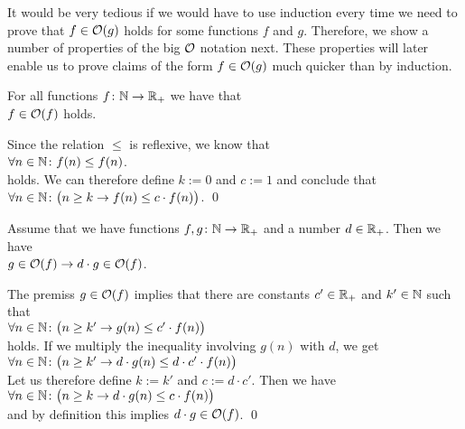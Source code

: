 It would be very tedious if we would have to use induction every time we need to prove that 
$f \in \mathcal{O}(g)$ holds for some functions $f$ and $g$.   Therefore, we show a number of properties of the
big $\mathcal{O}$ notation next.  These properties will later enable us to prove claims of the form 
$f \in \mathcal{O}(g)$ much quicker than by induction.

\begin{Proposition} 
  For all functions $f\colon {\mathbb N} \rightarrow {{\mathbb R}_+}$ we have that
  \\[0.2cm]
  \hspace*{1.3cm} $f \in \mathcal{O}(f)$ \quad holds. 
\end{Proposition}

\proof
Since the relation $\leq$ is reflexive, we know that 
\\[0.2cm]
\hspace*{1.3cm}
$\forall n \in {\mathbb N}\colon f(n) \leq f(n)$.
\\[0.2cm]
holds.  We can therefore define $k:=0$ and $c:=1$ and conclude that
\\[0.2cm]
\hspace*{1.3cm}
$\forall n \in {\mathbb N}\colon\bigl(n \geq k \rightarrow f(n) \leq c \cdot f(n)\bigr)$. \qed

\begin{Proposition} \hspace*{\fill} \linebreak
Assume that we have functions  $f,g\colon {\mathbb N} \rightarrow {{\mathbb R}_+}$ and a number $d \in {\mathbb R}_+$.  Then we
have 
\\[0.2cm]
\hspace*{1.3cm}
 $g \in \mathcal{O}(f) \rightarrow d \cdot g \in \mathcal{O}(f)$.
\end{Proposition}

\proof
The premiss $g \in \mathcal{O}(f)$ implies that there are constants $c'\in {\mathbb R}_+$ and $k'\in {\mathbb N}$ 
such that \\[0.2cm]
\hspace*{1.3cm} 
$\forall n \in {\mathbb N} \colon \bigl(n \geq k'  \rightarrow g(n) \leq c' \cdot f(n)\bigr)$ 
\\[0.2cm]
holds.  If we multiply the inequality involving $g(n)$ with $d$, we get \\[0.2cm]
\hspace*{1.3cm} 
$\forall n \in {\mathbb N} \colon\bigl( n \geq k'  \rightarrow d \cdot g(n) \leq d \cdot c' \cdot f(n)\bigr)$ 
\\[0.2cm]
Let us therefore define $k:=k'$ and $c := d \cdot c'$.  Then we have \\[0.2cm]
\hspace*{1.3cm}
$\forall n \in {\mathbb N} \colon \bigl(n \geq k  \rightarrow d \cdot g(n) \leq c \cdot f(n)\bigr)$ 
\\[0.2cm]
and by definition this implies $d \cdot g \in \mathcal{O}(f)$. \qed
\vspace*{0.2cm}

